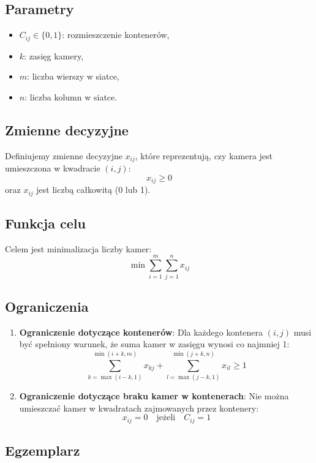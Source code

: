 \documentclass[12pt, letterpaper]{article}
\begin{document}
\subsection{Parametry}
\begin{itemize}
  \item \( C_{ij} \in \{0, 1\} \): rozmieszczenie kontenerów,
  \item \( k \): zasięg kamery,
  \item \( m \): liczba wierszy w siatce,
  \item \( n \): liczba kolumn w siatce.
\end{itemize}

\subsection{Zmienne decyzyjne}
Definiujemy zmienne decyzyjne \( x_{ij} \), które reprezentują, czy kamera jest
umieszczona w kwadracie \( (i, j) \):
\[
  x_{ij} \geq 0
\]
oraz \( x_{ij} \) jest liczbą całkowitą (0 lub 1).

\subsection{Funkcja celu}
Celem jest minimalizacja liczby kamer:
\[
  \min \sum_{i=1}^{m} \sum_{j=1}^{n} x_{ij}
\]

\subsection{Ograniczenia}
\begin{enumerate}
  \item \textbf{Ograniczenie dotyczące kontenerów}:
        Dla każdego kontenera \( (i, j) \) musi być spełniony warunek, że suma
        kamer w zasięgu wynosi co najmniej 1:
        \[
          \sum_{k=\max(i-k, 1)}^{\min(i+k, m)} x_{kj} + \sum_{l=\max(j-k,
            1)}^{\min(j+k, n)}
          x_{il} \geq 1
        \]

  \item \textbf{Ograniczenie dotyczące braku kamer w kontenerach}:
        Nie można umieszczać kamer w kwadratach zajmowanych przez kontenery:
        \[
          x_{ij} = 0 \quad \text{jeżeli} \quad C_{ij} = 1
        \]
\end{enumerate}

\subsection{Egzemplarz}
\end{document}
